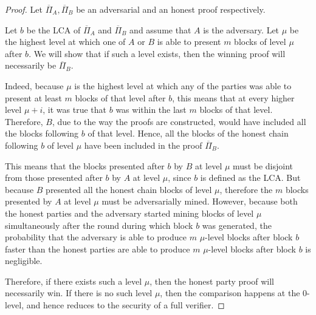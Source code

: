 \begin{proof}
    Let $\overline{\Pi}_A, \overline{\Pi}_B$ be an adversarial and an honest
    proof respectively.

    Let $b$ be the LCA of $\overline{\Pi}_A$ and $\overline{\Pi}_B$ and assume
    that $A$ is the adversary. Let $\mu$ be the highest level at which one of $A$
    or $B$ is able to present $m$ blocks of level $\mu$ after $b$. We will show
    that if such a level exists, then the winning proof will necessarily be
    $\overline{\Pi}_B$.

    Indeed, because $\mu$ is the highest level at which any of the parties was
    able to present at least $m$ blocks of that level after $b$, this means
    that at every higher level $\mu + i$, it was true that $b$ was within the
    last $m$ blocks of that level. Therefore, $B$, due to the way the proofs
    are constructed, would have included all the blocks following $b$ of that
    level. Hence, all the blocks of the honest chain following $b$ of level
    $\mu$ have been included in the proof $\overline{\Pi}_B$.

    This means that the blocks presented after $b$ by $B$ at level $\mu$ must
    be disjoint from those presented after $b$ by $A$ at level $\mu$, since $b$
    is defined as the LCA. But because $B$ presented all the honest chain
    blocks of level $\mu$, therefore the $m$ blocks presented by $A$ at level
    $\mu$ must be adversarially mined.  However, because both the honest
    parties and the adversary started mining blocks of level $\mu$
    simultaneously after the round during which block $b$ was generated, the
    probability that the adversary is able to produce $m$ $\mu$-level blocks
    after block $b$ faster than the honest parties are able to produce $m$
    $\mu$-level blocks after block $b$ is negligible.

    Therefore, if there exists such a level $\mu$, then the honest party proof
    will necessarily win. If there is no such level $\mu$, then the comparison
    happens at the 0-level, and hence reduces to the security of a full
    verifier.
\end{proof}

\restateThmFewLevels*


